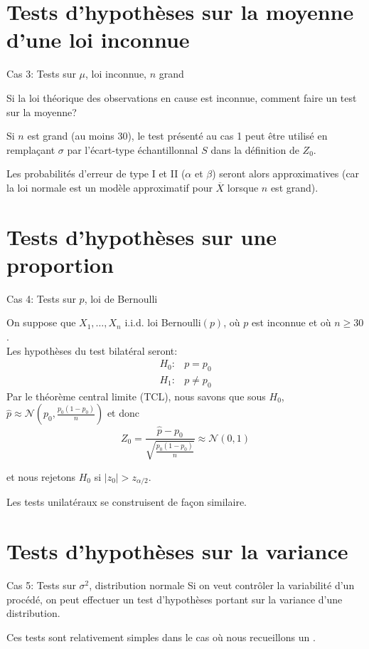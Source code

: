 \documentclass{BeamerTemplate}
\begin{document}
\section{Tests d'hypothèses sur la moyenne d'une loi inconnue}

\begin{frame}[t]{Cas 3: Tests sur $\mu$,  loi inconnue, $n$ grand}

Si la loi théorique des observations en cause est inconnue, comment faire un test sur la moyenne?

\vspace{5mm}

Si $n$ est grand (au moins 30), le test présenté au cas 1 peut être utilisé en rempla\c{c}ant $\sigma$ par l'écart-type échantillonnal $S$ dans la définition de $Z_0$.

\vspace{5mm}

Les probabilités d'erreur de type I et II ($\alpha$ et $\beta$) seront alors approximatives (car la loi normale est un modèle approximatif pour $\overline X$ lorsque $n$ est grand).

\end{frame}

\section{Tests d'hypothèses sur une proportion}

\begin{frame}[t]{Cas 4: Tests sur $p$, loi de Bernoulli}

On suppose que $X_1,\hdots,X_n$ i.i.d. loi Bernoulli$(p)$,
où $p$ est inconnue et où $n\geq 30$. \\

Les hypothèses du test bilatéral seront:
 $$\begin{array}{ll}
 H_0 : &p = p_0\\ H_1 : &p \neq p_0
 \end{array}$$
Par le théorème central limite (TCL), nous savons que sous $H_0$, $\hat{p}\approx \mathcal{N}(p_0, \frac{p_0(1-p_0)}{n})$ et donc $$Z_0=\frac{\hat{p}-p_0}{\sqrt{\frac{p_0(1-p_0)}{n}}}\approx \mathcal{N}(0,1)$$


 et nous rejetons $H_0$ si $|z_0|>z_{\alpha/2}$.

 Les tests unilatéraux se construisent de façon similaire.
\end{frame}
\section{Tests d'hypothèses sur la variance}
\begin{frame}[t]{Cas 5: Tests sur $\sigma^2$, distribution normale}
Si on veut contrôler la variabilité d'un procédé,
on peut effectuer un test d'hypothèses portant sur la variance d'une distribution.

\medskip
Ces tests sont relativement simples dans le cas où nous
recueillons un .
\end{frame}
\end{document}
